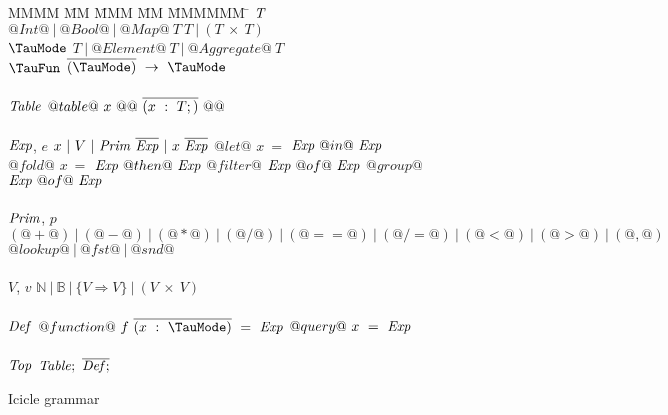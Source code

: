 
\begin{figure}
  \begin{center}
  \begin{minipage}{0.4\textwidth}
\begin{tabbing}
MMMM \= MM \= MMM \= MM \= MMMMMM \= \kill
$\mathit{T}$
\GrammarDefTab
  $@Int@~|~@Bool@~|~@Map@~T~T~|~(T~\times~T)$
\\
$\mi{\TauMode}$
\GrammarDefTab
  $T~|~@Element@~T~|~@Aggregate@~T$
\\
$\mi{\TauFun}$
\GrammarDefTab
  $\ov{(\TauMode)}~\to~\TauMode$
\\
\\

$\mathit{Table}$
\GrammarDefTab
  $@table@~x~@{@~\overline{(x~:~T;)}~@}@$
\\
\\

$\mathit{Exp}$, $e$
\GrammarDefTab
  $x~|~V~|~\mathit{Prim}~\overline{\mathit{Exp}}~|~x~\overline{\mathit{Exp}}$
\GrammarAlt
  $@let@$   \> $x~=$ \> $\mathit{Exp}~@  in@~\mathit{Exp}$
\GrammarAlt
  $@fold@$  \> $x~=$ \> $\mathit{Exp}~@then@~\mathit{Exp}$
\GrammarAlt
  $@filter@$\> \> $\mathit{Exp}~@  of@~\mathit{Exp}$
\GrammarAlt
  $@group@$ \> \> $\mathit{Exp}~@  of@~\mathit{Exp}$
\\
\\

$\mathit{Prim}$, $p$
\GrammarDefTab
  $(@+@)~|~(@-@)~|~(@*@)~|~(@/@)~|~(@==@)~|~(@/=@)~|~(@<@)~|~(@>@)~|~(@,@)$
\GrammarAlt
  $@lookup@~|~@fst@~|~@snd@$
\\
\\

$V$, $v$
\GrammarDefTab
 $\mathbb{N}~|~\mathbb{B}~|~\{V \Rightarrow V\}~|~(V~\times~V)$
\\
\\


$\mathit{Def}$
\GrammarDefTab
  $@function@~f~\ov{(x~:~\TauMode)}~=~\mi{Exp}$
\GrammarAlt
  $@query@~x~=~\mathit{Exp}$
\\
\\
$\mathit{Top}$
\GrammarDefTab
  $\mathit{Table};~\overline{\mathit{Def};}$
\end{tabbing}
\end{minipage}
  \end{center}

\caption{Icicle grammar}
\label{icicle:fig:source:grammar}
\end{figure}

